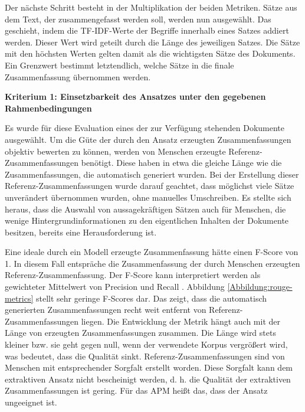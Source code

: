 Der nächste Schritt besteht in der Multiplikation der beiden Metriken. Sätze aus dem Text, der zusammengefasst werden soll, werden nun ausgewählt. Das geschieht, indem die TF-IDF-Werte der Begriffe innerhalb eines Satzes addiert werden. Dieser Wert wird geteilt durch die Länge des jeweiligen Satzes. Die Sätze mit den höchsten Werten gelten damit als die wichtigsten Sätze des Dokuments. Ein Grenzwert bestimmt letztendlich, welche Sätze in die finale Zusammenfassung übernommen werden.

{\bf Kriterium 1: Einsetzbarkeit des Ansatzes unter den gegebenen Rahmenbedingungen}

Es wurde für diese Evaluation eines der zur Verfügung stehenden Dokumente ausgewählt.
Um die Güte der durch den Ansatz erzeugten Zusammenfassungen objektiv bewerten zu können, werden von Menschen erzeugte Referenz-Zusammenfassungen benötigt. Diese haben in etwa die gleiche Länge wie die Zusammenfassungen, die automatisch generiert wurden. Bei der Erstellung dieser Referenz-Zusammenfassungen wurde darauf geachtet, dass möglichst viele Sätze unverändert übernommen wurden, ohne manuelles Umschreiben. Es stellte sich heraus, dass die Auswahl von aussagekräftigen Sätzen auch für Menschen, die wenige Hintergrundinformationen zu den eigentlichen Inhalten der Dokumente besitzen, bereits eine Herausforderung ist.
 
Eine ideale durch ein Modell erzeugte Zusammenfassung hätte einen F-Score von 1. In diesem Fall entspräche die Zusammenfassung der durch Menschen erzeugten Referenz-Zusammenfassung. Der F-Score kann interpretiert werden als gewichteter Mittelwert von Precision und Recall \cite{scikit2}. Abbildung \ref{Abbildung:rouge-metrics} stellt sehr geringe F-Scores dar. Das zeigt, dass die automatisch generierten Zusammenfassungen recht weit entfernt von Referenz-Zusammenfassungen liegen. Die Entwicklung der Metrik hängt auch mit der Länge von erzeugten Zusammenfassungen zusammen. Die Länge wird stets kleiner bzw. sie geht gegen null, wenn der verwendete Korpus vergrößert wird, was bedeutet, dass die Qualität sinkt.
Referenz-Zusammenfassungen sind von Menschen mit entsprechender Sorgfalt erstellt worden. Diese Sorgfalt kann dem extraktiven Ansatz nicht bescheinigt werden, d. h. die Qualität der extraktiven Zusammenfassungen ist gering. Für das APM heißt das, dass der Ansatz ungeeignet ist.

